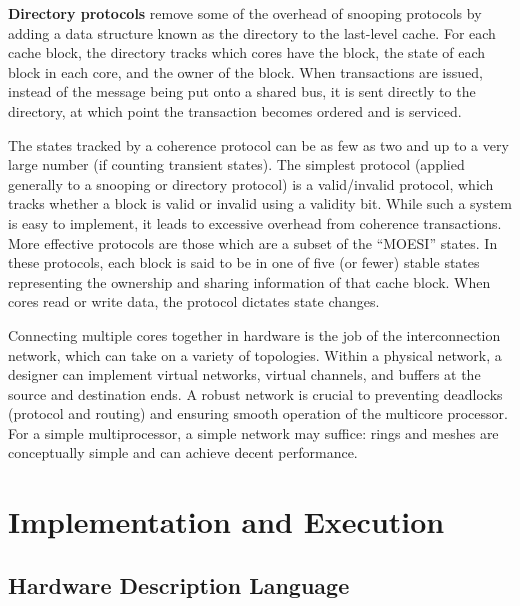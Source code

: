 \documentclass[10pt]{article}
\begin{document}
\textbf{Directory protocols} remove some of the overhead of snooping protocols by adding a data structure known as the directory to the last-level cache. For each cache block, the directory tracks which cores have the block, the state of each block in each core, and the owner of the block. When transactions are issued, instead of the message being put onto a shared bus, it is sent directly to the directory, at which point the transaction becomes ordered and is serviced. 

The states tracked by a coherence protocol can be as few as two and up to a very large number (if counting transient states). The simplest protocol (applied generally to a snooping or directory protocol) is a valid/invalid protocol, which tracks whether a block is valid or invalid using a validity bit. While such a system is easy to implement, it leads to excessive overhead from coherence transactions. More effective protocols are those which are a subset of the  ``MOESI'' states. In these protocols, each block is said to be in one of five (or fewer) stable states representing the ownership and sharing information of that cache block. When cores read or write data, the protocol dictates state changes. 

Connecting multiple cores together in hardware is the job of the interconnection network, which can take on a variety of topologies. Within a physical network, a designer can implement virtual networks, virtual channels, and buffers at the source and destination ends. A robust network is crucial to preventing deadlocks (protocol and routing) and ensuring smooth operation of the multicore processor. For a simple multiprocessor, a simple network may suffice: rings and meshes are conceptually simple and can achieve decent performance. 


\section{Implementation and Execution}
\subsection{Hardware Description Language}
\end{document}
